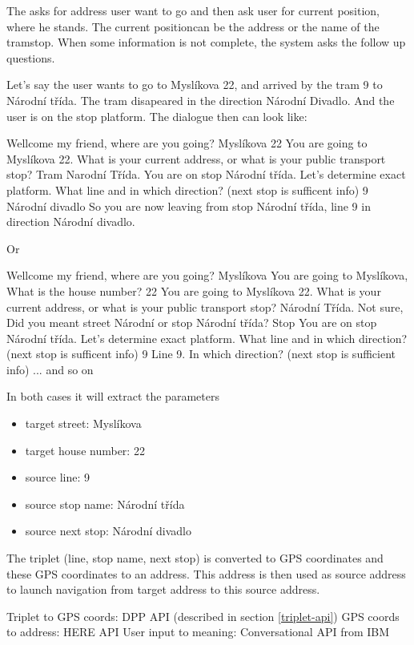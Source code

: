 	The \poi asks for address user want to go and then ask user for current position, where he stands. The current positioncan be the address or the name of the tramstop. When some information is not complete, the system asks the follow up questions.
	
	Let's say the user wants to go to Myslíkova 22, and arrived by the tram 9 to Národní třída. The tram disapeared in the direction Národní Divadlo. And the user is on the stop platform. The dialogue then can look like:
	
	Wellcome my friend, where are you going? 
	Myslíkova 22
	You are going to Myslíkova 22. What is your current address, or what is your public transport stop?
	Tram Narodní Třída.
	You are on stop Národní třída. Let's determine exact platform. What line and in which direction? (next stop is sufficent info)
	9 Národní divadlo
	So you are now leaving from stop Národní třída, line 9 in direction Národní divadlo.
	
	Or
	
	
	Wellcome my friend, where are you going? 
	Myslíkova
	You are going to Myslíkova, What is the house number?
	22
	You are going to Myslíkova 22. What is your current address, or what is your public transport stop?
	Národní Třída.
	Not sure, Did you meant street Národní or stop Národní třída?
	Stop
	You are on stop Národní třída. Let's determine exact platform. What line and in which direction? (next stop is sufficent info)
	9
	Line 9. In which direction? (next stop is sufficient info)
	... and so on
	
	
	
	In both cases it will extract the parameters
	\begin{itemize}
		\item target street: Myslíkova
		\item target house number: 22
		\item source line: 9
		\item source stop name: Národní třída
		\item source next stop: Národní divadlo
	\end{itemize}

	The triplet (line, stop name, next stop) is converted to GPS coordinates and these GPS coordinates to an address. This address is then used as source address to launch navigation from target address to this source address.
	
	Triplet to GPS coords: DPP API (described in section \ref{triplet-api})
	GPS coords to address: HERE API \cite{here-api}
	User input to meaning: Conversational API from IBM \cite{conversational-api}
	
